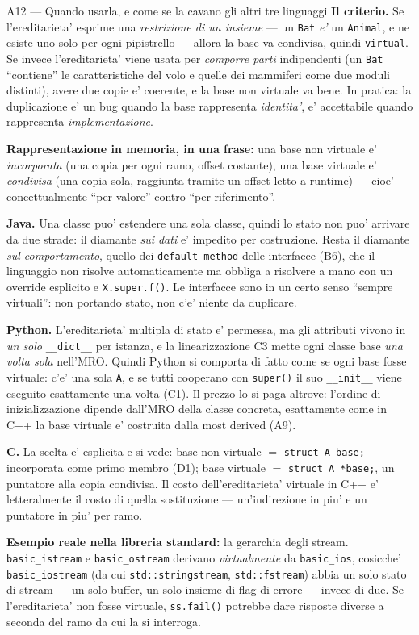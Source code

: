 \documentclass{report}
\newcommand{\code}[1]{\texttt{\small #1}}
\newcommand{\dunder}[1]{\texttt{\small \_\_#1\_\_}}
\begin{document}
\begin{soluzione}{A12 --- Quando usarla, e come se la cavano gli altri tre linguaggi}
\label{sol:A12}
\textbf{Il criterio.} Se l'ereditarieta' esprime una \emph{restrizione di un
insieme} --- un \code{Bat} \emph{e'} un \code{Animal}, e ne esiste uno solo per
ogni pipistrello --- allora la base va condivisa, quindi \code{virtual}. Se
invece l'ereditarieta' viene usata per \emph{comporre parti} indipendenti (un
\code{Bat} ``contiene'' le caratteristiche del volo e quelle dei mammiferi come
due moduli distinti), avere due copie e' coerente, e la base non virtuale va
bene. In pratica: la duplicazione e' un bug quando la base rappresenta
\emph{identita'}, e' accettabile quando rappresenta \emph{implementazione}.

\textbf{Rappresentazione in memoria, in una frase:} una base non virtuale e'
\emph{incorporata} (una copia per ogni ramo, offset costante), una base virtuale
e' \emph{condivisa} (una copia sola, raggiunta tramite un offset letto a runtime)
--- cioe' concettualmente ``per valore'' contro ``per riferimento''.

\textbf{Java.} Una classe puo' estendere una sola classe, quindi lo stato non
puo' arrivare da due strade: il diamante \emph{sui dati} e' impedito per
costruzione. Resta il diamante \emph{sul comportamento}, quello dei
\code{default method} delle interfacce (B6), che il linguaggio non risolve
automaticamente ma obbliga a risolvere a mano con un override esplicito e
\code{X.super.f()}. Le interfacce sono in un certo senso ``sempre virtuali'':
non portando stato, non c'e' niente da duplicare.

\textbf{Python.} L'ereditarieta' multipla di stato e' permessa, ma gli attributi
vivono in \emph{un solo} \code{\_\_dict\_\_} per istanza, e la linearizzazione C3
mette ogni classe base \emph{una volta sola} nell'MRO. Quindi Python si comporta
di fatto come se ogni base fosse virtuale: c'e' una sola \code{A}, e se tutti
cooperano con \code{super()} il suo \dunder{init} viene eseguito esattamente una
volta (C1). Il prezzo lo si paga altrove: l'ordine di inizializzazione dipende
dall'MRO della classe concreta, esattamente come in C++ la base virtuale e'
costruita dalla most derived (A9).

\textbf{C.} La scelta e' esplicita e si vede: base non virtuale $=$
\code{struct A base;} incorporata come primo membro (D1); base virtuale $=$
\code{struct A *base;}, un puntatore alla copia condivisa. Il costo
dell'ereditarieta' virtuale in C++ e' letteralmente il costo di quella
sostituzione --- un'indirezione in piu' e un puntatore in piu' per ramo.

\textbf{Esempio reale nella libreria standard:} la gerarchia degli stream.
\code{basic\_istream} e \code{basic\_ostream} derivano \emph{virtualmente} da
\code{basic\_ios}, cosicche' \code{basic\_iostream} (da cui \code{std::stringstream},
\code{std::fstream}) abbia un solo stato di stream --- un solo buffer, un solo
insieme di flag di errore --- invece di due. Se l'ereditarieta' non fosse
virtuale, \code{ss.fail()} potrebbe dare risposte diverse a seconda del ramo da
cui la si interroga.
\end{soluzione}
\end{document}
